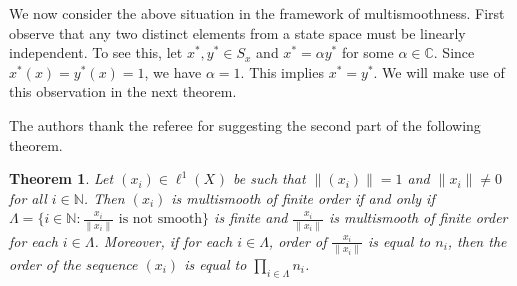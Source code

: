 \documentclass[12pt]{amsart}
\newtheorem{theorem}{Theorem}[section]
\theoremstyle{definition}
\numberwithin{equation}{section}
\begin{document}
We now consider the above situation in the framework of multismoothness. First observe that any two distinct elements from a state space must be linearly independent. To see this, let $x^*,y^*\in S_{x}$ and $x^*=\alpha y^*$ for some $\alpha\in \mathbb{C}$. Since $x^*(x)=y^*(x)=1$, we have $\alpha=1$. This implies $x^*=y^*$. We will make use of this observation in the next theorem. 

The authors thank the referee for suggesting the second part of the following theorem. 
\begin{theorem}\label{th24}
    Let $(x_i)\in \ell^{1}(X_{})$ be such that $\|(x_i)\|=1$ and $\|x_{i}\|\neq 0$ for all $i\in\mathbb{N}$. Then $(x_i)$ is multismooth of finite order if and only if $\Lambda=\{i\in\mathbb{N}:\frac{x_{i}}{\|x_{i}\|}\text{ is not smooth}\}$ is finite and $\frac{x_{i}}{\|x_{i}\|}$ is multismooth of finite order for each $i\in \Lambda$. Moreover, if for each $i\in \Lambda$, order of $\frac{x_{i}}{\|x_{i}\|}$ is equal to $n_{i}$, then the order of the sequence $(x_{i})$ is equal to $\prod_{i\in \Lambda} n_{i}$.
\end{theorem}
\end{document}
